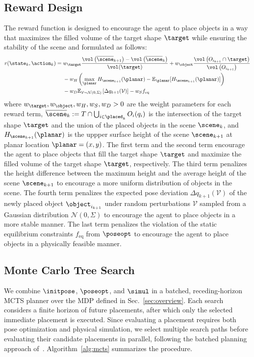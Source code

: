 \subsection{Reward Design}

The reward function is designed to encourage the agent to place objects in a way that maximizes the filled volume of the target shape $\target$ while ensuring the stability of the scene and formulated as follows:
\begin{equation*}
    \begin{split}
        r(\state_k, \action_k) 
        ={}& w_\target\frac{\vol\left(\overline{\scene}_{k+1}\right) - \vol\left(\overline{\scene}_k\right)}{\vol(\target)} + w_\object\frac{\vol\left(O_{i_{k+1}}\cap\target\right)}{\vol\left(O_{i_{k+1}}\right)} \\
        &- w_H\left(\max_{\planar}H_{\scene_{k+1}}(\planar) - \mathbb{E}_{\planar}[H_{\scene_{k+1}}(\planar)]\right) \\
        & - w_D\mathbb{E}_{\mathcal{V}\sim\mathcal{N}(0,\Sigma)}\left[\Delta q_{k+1}(\mathcal{V})\right]- w_S f_\text{eq}
    \end{split}
    \label{eq:reward_function}
\end{equation*}
where $w_\target, w_\object, w_H, w_S, w_D > 0$ are the weight parameters for each reward term, $\overline{\scene}_k := T \cap\bigcup_{i\in\placed_k} O_i(q_i)$ is the intersection of the target shape $\target$ and the union of the placed objects in the scene $\scene_k$, and $H_{\scene_{k+1}}(\planar)$ is the uppper surface height of the scene $\scene_{k+1}$ at planar location $\planar = (x,y)$.
The first term and the second term encourage the agent to place objects that fill the target shape $\target$ and maximize the filled volume of the target shape $\target$, respectively.
The third term penalizes the height difference between the maximum height and the average height of the scene $\scene_{k+1}$ to encourage a more uniform distribution of objects in the scene.
The fourth term penalizes the expected pose deviation $\Delta q_{k+1}(\mathcal{V})$ of the newly placed object $\object_{i_{k+1}}$ under random perturbations $\mathcal{V}$ sampled from a Gaussian distribution $\mathcal{N}(0,\Sigma)$ to encourage the agent to place objects in a more stable manner.
The last term penalizes the violation of the static equilibrium constraints $f_\text{eq}$ from $\poseopt$ to encourage the agent to place objects in a physically feasible manner.

\subsection{Monte Carlo Tree Search}
We combine $\initpose$, $\poseopt$, and $\simul$ in a batched,
receding-horizon MCTS planner over the MDP defined in
Sec.~\ref{sec:overview}. Each search considers a finite horizon of future
placements, after which only the selected immediate placement is executed.
Since evaluating a placement requires both pose optimization and physical
simulation, we select multiple search paths before evaluating their candidate
placements in parallel, following the batched planning approach
of~\cite{huang2022pmbs}. Algorithm~\ref{alg:mcts} summarizes the procedure.

